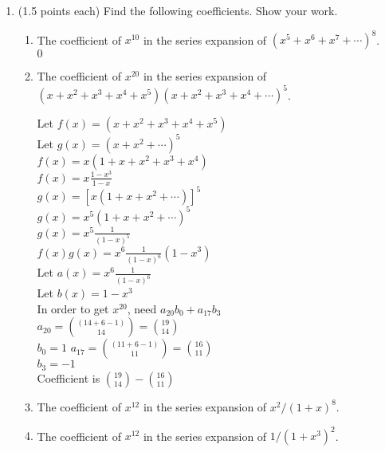\documentclass[11pt]{article}
\begin{document}
\begin{enumerate}
\begin{enumerate}
\end{enumerate}

\item (1.5 points each) Find the following coefficients.  Show your work.
\begin{enumerate}
\item The coefficient of $x^{10}$ in the series expansion of 
$(x^5+x^6 + x^7+ \cdots)^8$.\\
$0$
\item The coefficient of $x^{20}$ in the series expansion of 
$(x+x^2 + x^3+x^4+x^5) (x+x^2 + x^3+x^4+\cdots)^5 $.

Let $f(x) = (x + x^2 + x^3 + x^4 + x^5)$\\
Let $g(x) = (x + x^2 + \cdots)^5$\\
$f(x) = x(1 + x + x^2 + x^3 + x^4)$\\
$f(x) = x \frac{1-x^3}{1-x}$\\
$g(x) = [x(1 + x + x^2 + \cdots)]^5$\\
$g(x) = x^5(1 + x + x^2+ \cdots)^5$\\
$g(x) = x^5 \frac{1}{(1-x)^5}$\\
$f(x)g(x) = x^6 \frac{1}{(1-x)^6} (1 - x^3)$\\
Let $a(x) = x^6 \frac{1}{(1-x)^6}$\\
Let $b(x) = 1 - x^3$\\
In order to get $x^{20}$, need $a_{20}b_{0} + a_{17}b_{3}$\\
$a_{20} = {(14 + 6 - 1) \choose 14} = {19 \choose 14}$\\
$b_{0} = 1$
$a_{17} = {(11 + 6 -1) \choose 11} = {16 \choose 11}$\\
$b_{3} = -1$\\
Coefficient is ${19 \choose 14} - {16 \choose 11}$

\item The coefficient of $x^{12}$ in the series expansion of
$x^2/(1+x)^8$.
\item The coefficient of $x^{12}$ in the series expansion of
$1/(1+x^3)^2$.
\end{enumerate}

\end{enumerate}
\end{document}
